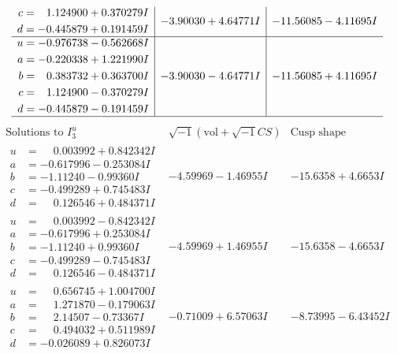 \documentclass[1p]{elsarticle_modified}
\theoremstyle{definition}
\newcommand{\I}{\sqrt{-1}}
\begin{document}
$$\begin{array}{c|c|c}
\begin{aligned}
c &= \phantom{-}1.124900 + 0.370279 I \\
d &= -0.445879 + 0.191459 I\end{aligned}
 & -3.90030 + 4.64771 I & -11.56085 - 4.11695 I \\ \hline\begin{aligned}
u &= -0.976738 - 0.562668 I \\
a &= -0.220338 + 1.221990 I \\
b &= \phantom{-}0.383732 + 0.363700 I \\
c &= \phantom{-}1.124900 - 0.370279 I \\
d &= -0.445879 - 0.191459 I\end{aligned}
 & -3.90030 - 4.64771 I & -11.56085 + 4.11695 I\\
 \hline 
 \end{array}$$\newpage$$\begin{array}{c|c|c}  
\text{Solutions to }I^u_{3}& \I (\text{vol} + \sqrt{-1}CS) & \text{Cusp shape}\\
 \hline 
\begin{aligned}
u &= \phantom{-}0.003992 + 0.842342 I \\
a &= -0.617996 - 0.253084 I \\
b &= -1.11240 - 0.99360 I \\
c &= -0.499289 + 0.745483 I \\
d &= \phantom{-}0.126546 + 0.484371 I\end{aligned}
 & -4.59969 - 1.46955 I & -15.6358 + 4.6653 I \\ \hline\begin{aligned}
u &= \phantom{-}0.003992 - 0.842342 I \\
a &= -0.617996 + 0.253084 I \\
b &= -1.11240 + 0.99360 I \\
c &= -0.499289 - 0.745483 I \\
d &= \phantom{-}0.126546 - 0.484371 I\end{aligned}
 & -4.59969 + 1.46955 I & -15.6358 - 4.6653 I \\ \hline\begin{aligned}
u &= \phantom{-}0.656745 + 1.004700 I \\
a &= \phantom{-}1.271870 - 0.179063 I \\
b &= \phantom{-}2.14507 - 0.73367 I \\
c &= \phantom{-}0.494032 + 0.511989 I \\
d &= -0.026089 + 0.826073 I\end{aligned}
 & -0.71009 + 6.57063 I & -8.73995 - 6.43452 I \\ \hline\begin{aligned}

\end{aligned}
\end{array}$$
\end{document}
